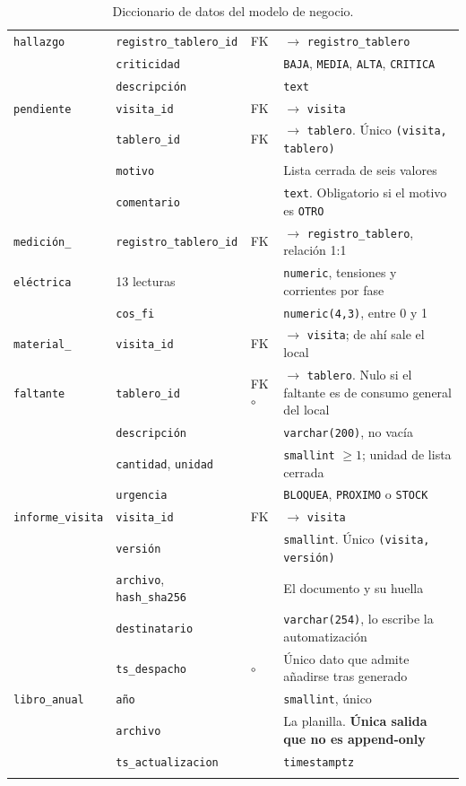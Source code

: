 \documentclass[10pt,letterpaper]{article}
\begin{document}
\begin{longtable}{@{}p{2.9cm}p{3.6cm}p{1.6cm}p{6.6cm}@{}}
\texttt{hallazgo} & \texttt{registro\_tablero\_id} & FK & $\to$ \texttt{registro\_tablero} \\
 & \texttt{criticidad} & & \texttt{BAJA}, \texttt{MEDIA}, \texttt{ALTA}, \texttt{CRITICA} \\
 & \texttt{descripción} & & \texttt{text} \\
\addlinespace

\texttt{pendiente} & \texttt{visita\_id} & FK & $\to$ \texttt{visita} \\
 & \texttt{tablero\_id} & FK & $\to$ \texttt{tablero}. Único \texttt{(visita, tablero)} \\
 & \texttt{motivo} & & Lista cerrada de seis valores \\
 & \texttt{comentario} & & \texttt{text}. Obligatorio si el motivo es \texttt{OTRO} \\
\addlinespace

\texttt{medición\_} & \texttt{registro\_tablero\_id} & FK & $\to$ \texttt{registro\_tablero}, relación 1:1 \\
\texttt{eléctrica} & 13 lecturas & & \texttt{numeric}, tensiones y corrientes por fase \\
 & \texttt{cos\_fi} & & \texttt{numeric(4,3)}, entre 0 y 1 \\
\addlinespace

\texttt{material\_} & \texttt{visita\_id} & FK & $\to$ \texttt{visita}; de ahí sale el local \\
\texttt{faltante} & \texttt{tablero\_id} & FK $\circ$ & $\to$ \texttt{tablero}. Nulo si el faltante es de consumo general del local \\
 & \texttt{descripción} & & \texttt{varchar(200)}, no vacía \\
 & \texttt{cantidad}, \texttt{unidad} & & \texttt{smallint} $\geq 1$; unidad de lista cerrada \\
 & \texttt{urgencia} & & \texttt{BLOQUEA}, \texttt{PROXIMO} o \texttt{STOCK} \\
\addlinespace

\texttt{informe\_visita} & \texttt{visita\_id} & FK & $\to$ \texttt{visita} \\
 & \texttt{versión} & & \texttt{smallint}. Único \texttt{(visita, versión)} \\
 & \texttt{archivo}, \texttt{hash\_sha256} & & El documento y su huella \\
 & \texttt{destinatario} & & \texttt{varchar(254)}, lo escribe la automatización \\
 & \texttt{ts\_despacho} & $\circ$ & Único dato que admite añadirse tras generado \\
\addlinespace

\texttt{libro\_anual} & \texttt{año} & & \texttt{smallint}, único \\
 & \texttt{archivo} & & La planilla. \textbf{Única salida que no es append-only} \\
 & \texttt{ts\_actualizacion} & & \texttt{timestamptz} \\

\bottomrule
\caption{Diccionario de datos del modelo de negocio.}
\end{longtable}
\end{document}
